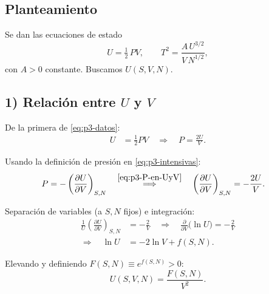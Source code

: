\documentclass{article}
\begin{document}
\subsection*{Planteamiento}

Se dan las ecuaciones de estado
\begin{equation}
U = \tfrac{1}{2}\,P V,
\qquad
T^{2} = \frac{A\,U^{3/2}}{V\,N^{1/2}},
\label{eq:p3-datos}
\end{equation}
con \(A>0\) constante. Buscamos \(U(S,V,N)\).

\subsection*{1) Relación entre \(U\) y \(V\)}

De la primera de \eqref{eq:p3-datos}:
\begin{equation}
\begin{split}
U &= \tfrac{1}{2}PV 
\quad\Longrightarrow\quad
P = \frac{2U}{V}.
\end{split}
\label{eq:p3-P-en-UyV}
\end{equation}

Usando la definición de presión en \eqref{eq:p3-intensivas}:
\begin{equation}
\begin{split}
P &= -\left(\frac{\partial U}{\partial V}\right)_{S,N}
\quad\stackrel{\eqref{eq:p3-P-en-UyV}}{\Longrightarrow}\quad
\left(\frac{\partial U}{\partial V}\right)_{S,N} = -\frac{2U}{V}.
\end{split}
\label{eq:p3-edo-V}
\end{equation}

Separación de variables (a \(S,N\) fijos) e integración:
\begin{equation}
\begin{split}
\frac{1}{U}\left(\frac{\partial U}{\partial V}\right)_{S,N} &= -\frac{2}{V}
\quad\Longrightarrow\quad
\frac{\partial}{\partial V}\big(\ln U\big) = -\frac{2}{V} \\[4pt]
\Longrightarrow\quad
\ln U &= -2\ln V + f(S,N).
\end{split}
\label{eq:p3-int-V}
\end{equation}

Elevando y definiendo \(F(S,N)\equiv e^{f(S,N)}\!>\!0\):
\begin{equation}
U(S,V,N) = \frac{F(S,N)}{V^{2}}.
\label{eq:p3-U-factorizada}
\end{equation}
\end{document}
